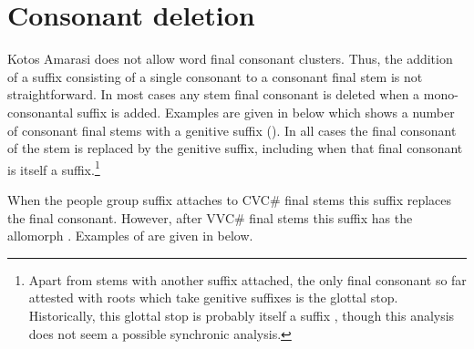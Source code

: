 \section{Consonant deletion}\label{sec:ConDel ch:Phon}
Kotos Amarasi does not allow word final consonant clusters.
Thus, the addition of a suffix consisting of a single consonant
to a consonant final stem is not straightforward.
In most cases any stem final consonant is deleted when
a mono-consonantal suffix is added.
Examples are given in  below
which shows a number of consonant final stems with
a genitive suffix ().
In all cases the final consonant of the stem
is replaced by the genitive suffix, including
when that final consonant is itself a suffix.\footnote{
		Apart from stems with another suffix attached,
		the only final consonant so far attested
		with roots which take genitive suffixes is the glottal stop.
		Historically, this glottal stop is probably itself a suffix \citep[77]{ed18d},
		though this analysis does not seem a possible synchronic analysis.}

\begin{exe}
	\label{ex:GloStoRepGenSuf}
\end{exe}

When the people group suffix 
attaches to CVC{\#} final stems this suffix replaces the final consonant.
However, after VVC{\#} final stems this suffix has the allomorph .
Examples of  are given in  below.

